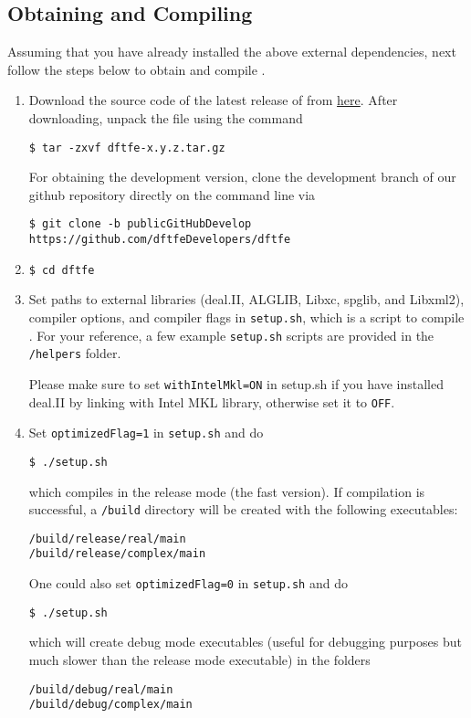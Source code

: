 \subsection{Obtaining and Compiling \dftfe{}}
Assuming that you have already installed the above external dependencies, next follow the steps below to obtain and compile \dftfe{}.
\begin{enumerate}
\item Download the source code of the latest release of \dftfe{} from \href{https://sites.google.com/umich.edu/dftfe/download}{here}. After downloading, unpack the file using the command
\begin{verbatim}
$ tar -zxvf dftfe-x.y.z.tar.gz
\end{verbatim}
For obtaining the development version, clone the development branch of our github repository directly on the command line via
\begin{verbatim}
$ git clone -b publicGitHubDevelop https://github.com/dftfeDevelopers/dftfe
\end{verbatim}

\item   \begin{verbatim}
$ cd dftfe
\end{verbatim}


\item Set paths to external libraries (deal.II, ALGLIB, Libxc, spglib, and Libxml2), compiler options, and compiler flags in \verb|setup.sh|, which is a script to compile \dftfe{}. For your reference, a few example \verb|setup.sh| scripts are provided in the \verb|/helpers| folder. 
	
Please make sure to set \verb|withIntelMkl=ON| in setup.sh if you have installed deal.II by linking with Intel MKL library, otherwise set it to \verb|OFF|. 

\item Set \verb|optimizedFlag=1| in \verb|setup.sh| and do
\begin{verbatim}
$ ./setup.sh
\end{verbatim} 
which compiles \dftfe{} in the release mode (the fast version). If compilation is successful, a \verb|/build| directory will be created with the following executables:
\begin{verbatim}
/build/release/real/main
/build/release/complex/main
\end{verbatim}
One could also set \verb|optimizedFlag=0| in \verb|setup.sh| and do
\begin{verbatim}
$ ./setup.sh
\end{verbatim}
which will create debug mode executables (useful for debugging purposes but much slower than the release mode executable) in the folders
\begin{verbatim}
/build/debug/real/main
/build/debug/complex/main
\end{verbatim}
\end{enumerate}
